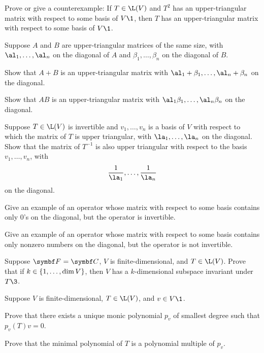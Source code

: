 \begin{exercises}

\exercise
Prove or give a counterexample: If $T \in \L(V)$ and $T^2$ has an upper-triangular matrix with respect to some basis of $V\1$, then $T$ has an upper-triangular matrix with respect to some basis of $V\1$.


\exercise
Suppose $A$ and $B$ are upper-triangular matrices of the same size, with $\al_1, \ldots, \al_n$ on the diagonal of $A$ and
$\beta_1, \ldots, \beta_n$ on the diagonal of $B$.\label{2AB}
\begin{subtheorem}
\item
Show that $A+B$ is an upper-triangular matrix with $\al_1 + \beta _1, \ldots, \al_n + \beta_n$ on the diagonal.
\item
Show that $AB$ is an upper-triangular matrix with $\al_1 \beta _1, \ldots, \al_n \beta_n$ on the diagonal.
\end{subtheorem}


\exercise
Suppose $T \in \L(V)$ is invertible and $v_1, \dots, v_n$ is a basis of $V$ with respect to which the matrix of $T$ is upper triangular, with $\la_1, \ldots, \la_n$ on the diagonal.
Show that the matrix of $T^{-1}$ is also upper triangular with respect to the basis $v_1, \dots, v_n$, with
\[
\frac{1}{\la_1}, \ldots, \frac{1}{\la_n}
\]
on the diagonal.


\exercise
Give an example of an operator whose matrix with respect to some basis contains only $0$'s on the diagonal, but the operator is invertible.


\exercise
Give an example of an operator whose matrix with respect to some basis contains
only nonzero numbers on the diagonal, but the operator is not invertible.


\exercise
Suppose $\F{} = \C{}$, $V$ is finite-dimensional, and $T \in \L(V)$. Prove that if $k \in \{1, \dots, \dim V\}$,
then $V$ has a $k$-dimensional subspace invariant under $T\3$. \label{457}


\exercise
Suppose $V$ is finite-dimensional, $T \in \L(V)$, and $v \in V\1$. \label{2minpolyv}
\begin{subtheorem}
\item
Prove that there exists a unique monic polynomial $p_v$ of smallest degree such that $p_v(T)v = 0$.
\item
Prove that the minimal polynomial of $T$ is a polynomial multiple of $p_v$.
\end{subtheorem}
\exercisesubtheoremend



\end{exercises}
